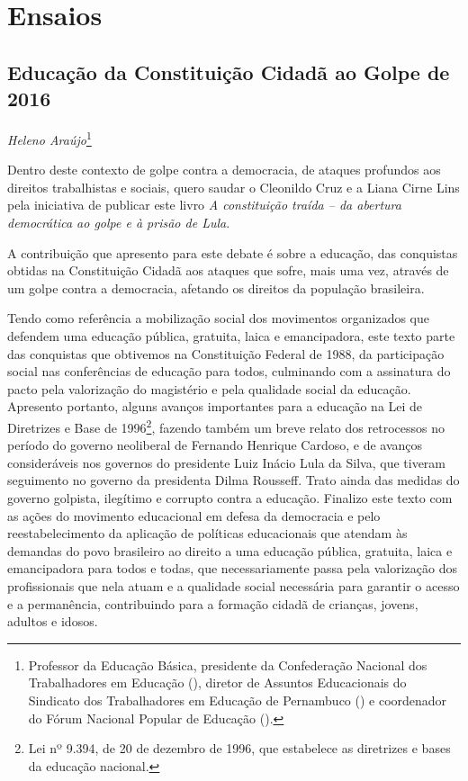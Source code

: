 \part{Ensaios}

\chapter*{Educação da Constituição Cidadã ao Golpe de 2016}


\begin{flushright}
\emph{Heleno Araújo}\footnote{Professor da Educação Básica, presidente da
  Confederação Nacional dos Trabalhadores em Educação (), diretor
  de Assuntos Educacionais do Sindicato dos Trabalhadores em Educação de
  Pernambuco () e coordenador do Fórum Nacional Popular de
  Educação ().}
\end{flushright}

Dentro deste contexto de golpe contra a democracia, de ataques profundos
aos direitos trabalhistas e sociais, quero saudar o Cleonildo Cruz e a
Liana Cirne Lins pela iniciativa de publicar este livro \emph{A constituição traída --
da abertura democrática ao golpe e à prisão de Lula}.

A contribuição que apresento para este debate é sobre a educação, das
conquistas obtidas na Constituição Cidadã aos ataques que sofre, mais uma vez,
através de um golpe contra a democracia, afetando os direitos da
população brasileira.

Tendo como referência a mobilização social dos movimentos organizados
que defendem uma educação pública, gratuita, laica e emancipadora, este
texto parte das conquistas que obtivemos na Constituição Federal de
1988, da participação social nas conferências de educação para todos,
culminando com a assinatura do pacto pela valorização do magistério e
pela qualidade social da educação. Apresento portanto, alguns avanços
importantes para a educação na Lei de Diretrizes e Base de
1996\footnote{Lei nº 9.394, de 20 de dezembro de 1996, que
  estabelece as diretrizes e bases da educação nacional.}, fazendo
também um breve relato dos retrocessos no período do governo neoliberal
de Fernando Henrique Cardoso, e de avanços consideráveis nos governos do
presidente Luiz Inácio Lula da Silva, que tiveram seguimento no governo da
presidenta Dilma Rousseff. Trato ainda das medidas do governo golpista,
ilegítimo e corrupto contra a educação. Finalizo este texto com as ações
do movimento educacional em defesa da democracia e pelo
reestabelecimento da aplicação de políticas educacionais que atendam às
demandas do povo brasileiro ao direito a uma educação pública,
gratuita, laica e emancipadora para todos e todas, que necessariamente
passa pela valorização dos profissionais que nela atuam e a qualidade
social necessária para garantir o acesso e a permanência, contribuindo
para a formação cidadã de crianças, jovens, adultos e idosos.

